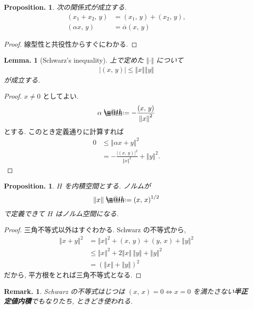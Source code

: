 \documentclass[openany, a4paper, oneside]{jsbook}
\makeatletter
\newcommand*{\defeq}{\mathrel{\rlap{%
\raisebox{0.3ex}{$\m@th\cdot$}}%
\raisebox{-0.3ex}{$\m@th\cdot$}}%
=}
\theoremstyle{break}
\theoremstyle{breakdefn}
\newtheorem{lem}[thm]{Lemma.}
\newtheorem{prop}[thm]{Proposition.}
\newtheorem{rem}[thm]{Remark.}
\newcommand{\abs}[1]{\left|#1\right|}
\newcommand{\norm}[1]{\left\Vert#1\right\Vert}
\newcommand{\rbk}[1]{\left (#1\right)}
\newcommand{\rbkt}[2]{\left ( #1,\,#2 \right)}
\makeatother
\begin{document}
\begin{prop}
 次の関係式が成立する.
 \begin{align}
  \rbkt{x_1 + x_2}{y}
  &=
  \rbkt{x_1}{y} + \rbkt{x_2}{y}, \\
  \rbkt{\alpha x}{y}
  &=
  \overline{\alpha} \rbkt{x}{y}
 \end{align}
\end{prop}
\begin{proof}
線型性と共役性からすぐにわかる.
\end{proof}
\begin{lem}[Schwarz's inequality]
 上で定めた $\norm{\cdot}$ について
 \begin{align}
  \abs{\rbkt{x}{y}}
  \leq
  \norm{x} \norm{y}
 \end{align}
 が成立する.
\end{lem}
\begin{proof}
$x \neq 0$ としてよい.
\begin{align}
 \alpha
 \defeq
 -\frac{\rbkt{x}{y}}{\norm{x}^2}
\end{align}
とする.
このとき定義通りに計算すれば
\begin{align}
 0
 &\le
 \norm{\alpha x + y}^2 \\
 &=
 -\frac{\abs{\rbkt{x}{y}}^2}{\norm{x}^2} + \norm{y}^2.
\end{align}
\end{proof}

\begin{prop}
 $H$ を内積空間とする.
 ノルムが
 \begin{align}
  \norm{x}
  \defeq
  \rbkt{x}{x}^{1/2}
 \end{align}
 で定義できて $H$ はノルム空間になる.
\end{prop}
\begin{proof}
三角不等式以外はすぐわかる.
Schwarz の不等式から,
\begin{align}
 \norm{x + y}^2
 &=
 \norm{x}^2 + \rbkt{x}{y} + \rbkt{y}{x} + \norm{y}^2 \\
 &\le
 \norm{x}^2  + 2 \norm{x} \, \norm{y} + \norm{y}^2 \\
 &=
 \rbk{\norm{x} + \norm{y}}^2
\end{align}
だから, 平方根をとれば三角不等式となる.
\end{proof}
\begin{rem}
Schwarz の不等式はじつは
$\rbkt{x}{x} = 0 \Leftrightarrow x = 0$
を満たさない\textbf{半正定値内積}でもなりたち, ときどき使われる.
\end{rem}
\end{document}
